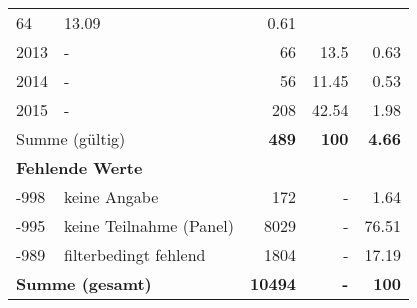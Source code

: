 \begin{longtable}{lXrrr}
       \num{64} &
       \num[round-mode=places,round-precision=2]{13.09} &
         \num[round-mode=places,round-precision=2]{0.61} \\

     2013 &
     \multicolumn{1}{X}{ -  } &


       \num{66} &
       \num[round-mode=places,round-precision=2]{13.5} &
         \num[round-mode=places,round-precision=2]{0.63} \\

     2014 &
     \multicolumn{1}{X}{ -  } &


       \num{56} &
       \num[round-mode=places,round-precision=2]{11.45} &
         \num[round-mode=places,round-precision=2]{0.53} \\

     2015 &
     \multicolumn{1}{X}{ -  } &


       \num{208} &
       \num[round-mode=places,round-precision=2]{42.54} &
         \num[round-mode=places,round-precision=2]{1.98} \\
     \midrule
     \multicolumn{2}{l}{Summe (gültig)} &
       \textbf{\num{489}} &
     \textbf{\num{100}} &
       \textbf{\num[round-mode=places,round-precision=2]{4.66}} \\
     \multicolumn{5}{l}{\textbf{Fehlende Werte}}\\
       -998 &
       keine Angabe &
         \num{172} &
        - &
         \num[round-mode=places,round-precision=2]{1.64} \\
       -995 &
       keine Teilnahme (Panel) &
         \num{8029} &
        - &
         \num[round-mode=places,round-precision=2]{76.51} \\
       -989 &
       filterbedingt fehlend &
         \num{1804} &
        - &
         \num[round-mode=places,round-precision=2]{17.19} \\
     \midrule
     \multicolumn{2}{l}{\textbf{Summe (gesamt)}} &
          \textbf{\num{10494}} &
        \textbf{-} &
        \textbf{\num{100}} \\
     \bottomrule
     \end{longtable}
     

